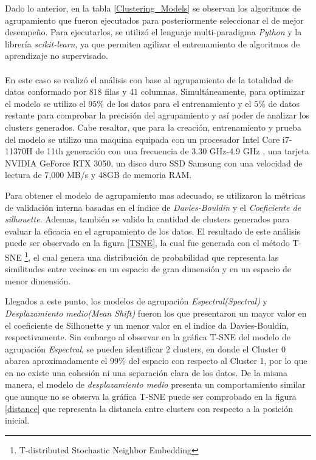 Dado lo anterior, en la tabla \ref{Clustering_Models} se observan los algoritmos de agrupamiento que fueron ejecutados para posteriormente seleccionar el de mejor desempeño. Para ejecutarlos, se utilizó el lenguaje multi-paradigma \textit{Python} y la librería \textit{scikit-learn}, ya que permiten agilizar el entrenamiento de algoritmos de aprendizaje no supervisado.
\\\\
En este caso se realizó el análisis con base al agrupamiento de la totalidad de datos conformado por $818$ filas y $41$ columnas. Simultáneamente, para optimizar el modelo se utilizo el $95\%$ de los datos para el entrenamiento y el $5\%$ de datos restante para comprobar la precisión del agrupamiento y así poder de analizar los clusters generados. Cabe resaltar, que para la creación, entrenamiento y prueba del modelo se utilizo una maquina equipada con un procesador Intel Core i7-11370H de 11th generación con una frecuencia de 3.30 GHz-4.9 GHz , una tarjeta NVIDIA GeForce RTX 3050, un disco duro SSD Samsung con una velocidad de lectura de  7,000 MB/s y 48GB de memoria RAM. 

Para obtener el modelo de agrupamiento mas adecuado, se utilizaron la métricas de validación interna basadas en el índice de \textit{Davies-Bouldin} y el \textit{Coeficiente de silhouette}. Ademas, también se valido la cantidad de clusters generados para evaluar la eficacia en el agrupamiento de los datos. El resultado de este análisis puede ser observado en la figura \ref{TSNE}, la cual fue generada con el método T-SNE \footnote{T-distributed Stochastic Neighbor Embedding}, el cual genera una distribución de probabilidad que representa las similitudes entre vecinos en un espacio de gran dimensión y en un espacio de menor dimensión. 

Llegados a este punto, los modelos de agrupación \textit{Espectral(Spectral)} y \textit{Desplazamiento medio(Mean Shift)}  fueron los que presentaron un mayor valor en el coeficiente de Silhouette y un menor valor en el indice da Davies-Bouldin, respectivamente. Sin embargo al observar en la gráfica T-SNE del modelo de agrupación \textit{Espectral}, se pueden identificar 2 clusters, en donde el Cluster 0 abarca aproximadamente el 99\% del espacio con respecto al Cluster 1, por lo que en no existe una cohesión ni una separación clara de los datos. De la misma manera, el modelo de \textit{desplazamiento medio} presenta un comportamiento similar que aunque no se observa la gráfica T-SNE puede ser comprobado en la figura \ref{distance} que representa la distancia entre clusters con respecto a la posición inicial.


